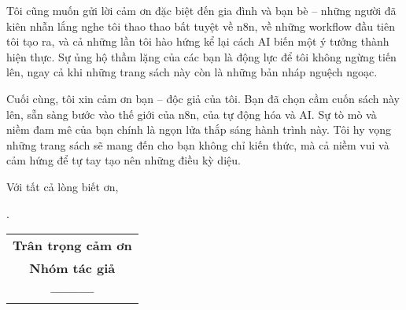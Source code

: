 Tôi cũng muốn gửi lời cảm ơn đặc biệt đến gia đình và bạn bè – những người đã kiên nhẫn lắng nghe tôi thao thao bất tuyệt về n8n, về những workflow đầu tiên tôi tạo ra, và cả những lần tôi hào hứng kể lại cách AI biến một ý tưởng thành hiện thực. Sự ủng hộ thầm lặng của các bạn là động lực để tôi không ngừng tiến lên, ngay cả khi những trang sách này còn là những bản nháp nguệch ngoạc.

Cuối cùng, tôi xin cảm ơn bạn – độc giả của tôi. Bạn đã chọn cầm cuốn sách này lên, sẵn sàng bước vào thế giới của n8n, của tự động hóa và AI. Sự tò mò và niềm đam mê của bạn chính là ngọn lửa thắp sáng hành trình này. Tôi hy vọng những trang sách sẽ mang đến cho bạn không chỉ kiến thức, mà cả niềm vui và cảm hứng để tự tay tạo nên những điều kỳ diệu.

Với tất cả lòng biết ơn,


\begin{flushright}
	.
	
	\begin{tabular}{c}
		\textbf{Trân trọng cảm ơn}\\
		
		\textbf{Nhóm tác giả}\\
		
		\textbf{---------}\\
	\end{tabular}
\end{flushright}